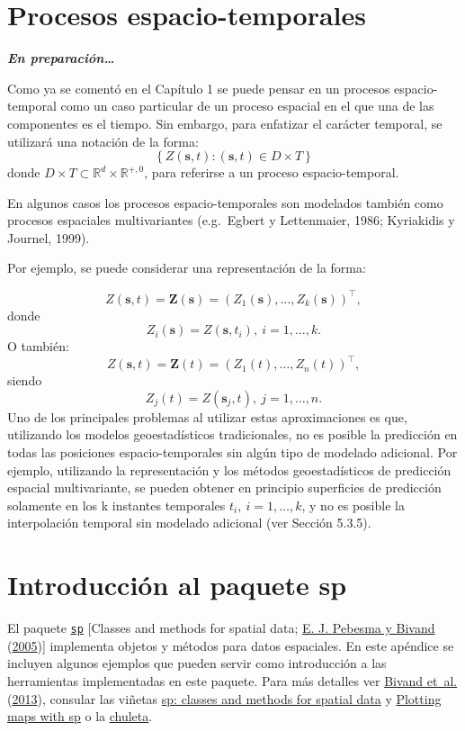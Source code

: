 \documentclass[
  spanish,
]{book}
\theoremstyle{break}
\theoremstyle{definition}
\theoremstyle{definition}
\theoremstyle{definition}
\theoremstyle{definition}
\theoremstyle{remark}
\begin{document}
\hypertarget{esp-temp}{%
\chapter{Procesos espacio-temporales}\label{esp-temp}}

\textbf{\emph{En preparación\ldots{}}}

Como ya se comentó en el Capítulo 1 se puede pensar en un procesos espacio-temporal como un caso particular de un proceso espacial en el que una de las componentes es el tiempo.
Sin embargo, para enfatizar el carácter temporal, se utilizará una notación de la forma:
\[\left\{ Z(\mathbf{s},t):(\mathbf{s},t)\in D\times T\right\}\]
donde \(D\times T\subset \mathbb{R} ^{d} \times \mathbb{R}^{+,0}\), para
referirse a un proceso espacio-temporal.

En algunos casos los procesos espacio-temporales son modelados también
como procesos espaciales multivariantes (e.g.~Egbert y Lettenmaier,
1986; Kyriakidis y Journel, 1999).

Por ejemplo, se puede considerar una representación de la forma:

\[Z(\mathbf{s},t)=\mathbf{Z}(\mathbf{s})=(Z_{1} (\mathbf{s}), \ldots,Z_{k} (
\mathbf{s}))^\top,\]
donde
\[Z_{i} (\mathbf{s})=Z(\mathbf{s},t_{i} ),\  i=1, \ldots,k.\]
O también:
\[Z(\mathbf{s},t) = \mathbf{Z}(t) =  \left(Z_{1}(t), \ldots, Z_{n}(t) \right)^\top,\]
siendo
\[Z_{j} (t)=Z(\mathbf{s}_{j} ,t),\  j=1, \ldots,n.\]
Uno de los principales problemas al utilizar estas aproximaciones es que, utilizando los modelos geoestadísticos tradicionales, no es posible la
predicción en todas las posiciones espacio-temporales sin algún tipo de
modelado adicional. Por ejemplo, utilizando la representación y los métodos geoestadísticos de predicción espacial multivariante, se pueden obtener en principio superficies de predicción solamente en los k instantes temporales \(t_{i} ,\  i=1, \ldots, k\),
y no es posible la interpolación temporal sin modelado adicional (ver Sección 5.3.5).

\hypertarget{appendix-apendices}{%
\appendix}


\hypertarget{intro-sp}{%
\chapter{\texorpdfstring{Introducción al paquete \textbf{sp}}{Introducción al paquete sp}}\label{intro-sp}}

El paquete \href{https://CRAN.R-project.org/package=sp}{\texttt{sp}} {[}Classes and methods for spatial data; \protect\hyperlink{ref-Pebesma2005}{E. J. Pebesma y Bivand} (\protect\hyperlink{ref-Pebesma2005}{2005}){]} implementa objetos y métodos para datos espaciales.
En este apéndice se incluyen algunos ejemplos que pueden servir como introducción a las herramientas implementadas en este paquete.
Para más detalles ver \protect\hyperlink{ref-Bivand2013}{Bivand et~al.} (\protect\hyperlink{ref-Bivand2013}{2013}), consular las viñetas \href{https://cran.r-project.org/web/packages/sp/vignettes/intro_sp.pdf}{sp: classes and methods for spatial data} y \href{https://edzer.github.io/sp}{Plotting maps with sp} o la \href{https://www.maths.lancs.ac.uk/~rowlings/Teaching/UseR2012/cheatsheet.html}{chuleta}.
\end{document}
